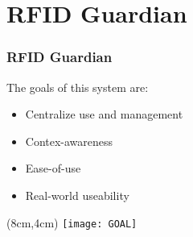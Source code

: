 \section{RFID Guardian}
\begin{frame}
 \frametitle{RFID Guardian}

 The goals of this system are:
 \begin{itemize}
  \item<1-> Centralize use and management
  \item<2-> Contex-awareness
  \item<3-> Ease-of-use
  \item<4-> Real-world useability
 \end{itemize}


 \begin{textblock*}{5cm}(8cm,4cm)
  \texttt{[image: GOAL]}
 \end{textblock*}

\end{frame}
